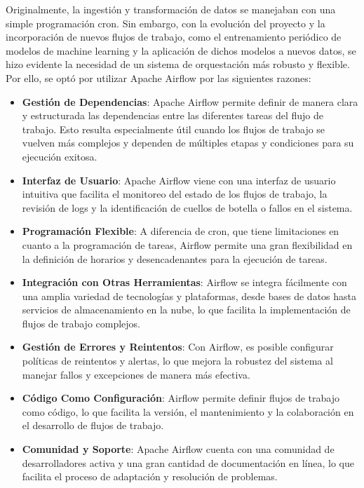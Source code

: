 Originalmente, la ingestión y transformación de datos se manejaban con una simple programación cron. Sin embargo, con la evolución del proyecto y la incorporación de nuevos flujos de trabajo, como el entrenamiento periódico de modelos de machine learning y la aplicación de dichos modelos a nuevos datos, se hizo evidente la necesidad de un sistema de orquestación más robusto y flexible. Por ello, se optó por utilizar Apache Airflow por las siguientes razones:

\begin{itemize}
\item \textbf{Gestión de Dependencias}: Apache Airflow permite definir de manera clara y estructurada las dependencias entre las diferentes tareas del flujo de trabajo. Esto resulta especialmente útil cuando los flujos de trabajo se vuelven más complejos y dependen de múltiples etapas y condiciones para su ejecución exitosa.

\item \textbf{Interfaz de Usuario}: Apache Airflow viene con una interfaz de usuario intuitiva que facilita el monitoreo del estado de los flujos de trabajo, la revisión de logs y la identificación de cuellos de botella o fallos en el sistema.

\item \textbf{Programación Flexible}: A diferencia de cron, que tiene limitaciones en cuanto a la programación de tareas, Airflow permite una gran flexibilidad en la definición de horarios y desencadenantes para la ejecución de tareas.

\item \textbf{Integración con Otras Herramientas}: Airflow se integra fácilmente con una amplia variedad de tecnologías y plataformas, desde bases de datos hasta servicios de almacenamiento en la nube, lo que facilita la implementación de flujos de trabajo complejos.

\item \textbf{Gestión de Errores y Reintentos}: Con Airflow, es posible configurar políticas de reintentos y alertas, lo que mejora la robustez del sistema al manejar fallos y excepciones de manera más efectiva.

\item \textbf{Código Como Configuración}: Airflow permite definir flujos de trabajo como código, lo que facilita la versión, el mantenimiento y la colaboración en el desarrollo de flujos de trabajo.

\item \textbf{Comunidad y Soporte}: Apache Airflow cuenta con una comunidad de desarrolladores activa y una gran cantidad de documentación en línea, lo que facilita el proceso de adaptación y resolución de problemas.
\end{itemize}

